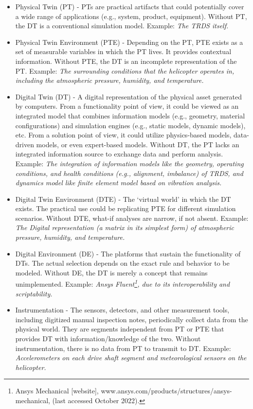 \documentclass[runningheads]{llncs}
\begin{document}
\begin{itemize}
    \item Physical Twin (PT) - PTs are practical artifacts that could potentially cover a wide range of applications (e.g., system, product, equipment). Without PT, the DT is a conventional simulation model. Example: \textit{The TRDS itself.}
    \item Physical Twin Environment (PTE) - Depending on the PT, PTE exists as a set of measurable variables in which the PT lives. It provides contextual information. Without PTE, the DT is an incomplete representation of the PT. Example: \textit{The surrounding conditions that the helicopter operates in, including the atmospheric pressure, humidity, and temperature.}
    \item Digital Twin (DT) - A digital representation of the physical asset generated by computers. From a functionality point of view, it could be viewed as an integrated model that combines information models (e.g., geometry, material configurations) and simulation engines (e.g., static models, dynamic models), etc. From a solution point of view, it could utilize physics-based models, data-driven models, or even expert-based models. Without DT, the PT lacks an integrated information source to exchange data and perform analysis. Example: \textit{The integration of information models like the geometry, operating conditions, and health conditions (e.g., alignment, imbalance) of TRDS, and dynamics model like finite element model based on vibration analysis.}
    \item Digital Twin Environment (DTE) - The `virtual world' in which the DT exists. The practical use could be replicating PTE for different simulation scenarios. Without DTE, what-if analyses are narrow, if not absent. Example: \textit{The Digital representation (a matrix in its simplest form) of atmospheric pressure, humidity, and temperature.}
    \item Digital Environment (DE) - The platforms that sustain the functionality of DTs. The actual selection depends on the exact rule and behavior to be modeled. Without DE, the DT is merely a concept that remains unimplemented. Example: \textit{Ansys Fluent\footnote{Ansys Mechanical [website], www.ansys.com/products/structures/ansys-mechanical, (last accessed October 2022).}, due to its interoperability and scriptability.}
    \item Instrumentation - The sensors, detectors, and other measurement tools, including digitized manual inspection notes, periodically collect data from the physical world. They are segments independent from PT or PTE that provides DT with information/knowledge of the two. Without instrumentation, there is no data from PT to transmit to DT. Example: \textit{Accelerometers on each drive shaft segment and meteorological sensors on the helicopter.}

\end{itemize}
\end{document}
